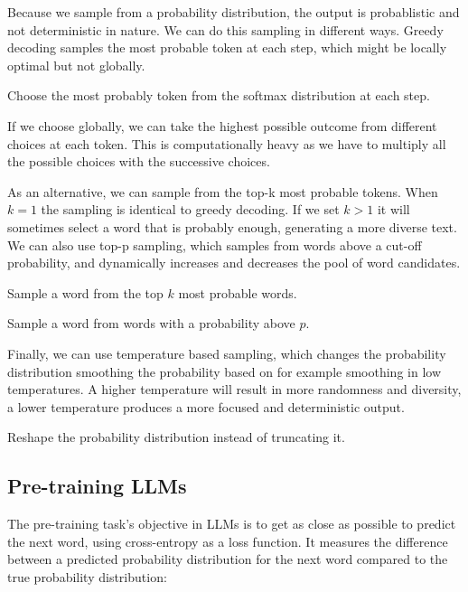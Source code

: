 Because we sample from a probability distribution, the output is
probablistic and
not deterministic in nature. We can do this sampling in different
ways. Greedy decoding
samples the most probable token at each step, which might be locally
optimal but not
globally.

\begin{definition}
  Choose the most probably token from the softmax distribution at each step.
\end{definition}

If we choose globally, we can take the highest possible outcome from different
choices at each token. This is computationally heavy as we have to multiply all
the possible choices with the successive choices.

As an alternative, we can sample from the top-k most probable tokens.
When $k = 1$ the
sampling is identical to greedy decoding. If we set $k > 1$ it will
sometimes select
a word that is probably enough, generating a more diverse text. We
can also use top-p sampling,
which samples from words above a cut-off probability, and dynamically
increases and decreases
the pool of word candidates.

\begin{definition}
  Sample a word from the top $k$ most probable words.
\end{definition}

\begin{definition}
  Sample a word from words with a probability above $p$.
\end{definition}

Finally, we can use temperature based sampling, which changes the
probability distribution smoothing
the probability based on for example smoothing in low temperatures. A
higher temperature will result in
more randomness and diversity, a lower temperature produces a  more
focused and deterministic output.

\begin{definition}
  Reshape the probability distribution instead of truncating it.
\end{definition}

\subsection{Pre-training LLMs}

The pre-training task's objective in LLMs is to get as close as
possible to predict the next
word, using cross-entropy as a loss function. It measures the
difference between a predicted
probability distribution for the next word compared to the true
probability distribution:

